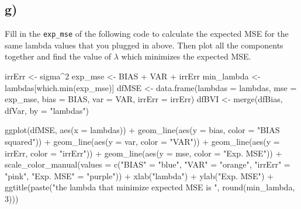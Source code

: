 \documentclass[
]{article}
\newenvironment{Shaded}{\begin{snugshade}}{\end{snugshade}}
\newcommand{\AttributeTok}[1]{\textcolor[rgb]{0.77,0.63,0.00}{#1}}
\newcommand{\DecValTok}[1]{\textcolor[rgb]{0.00,0.00,0.81}{#1}}
\newcommand{\FunctionTok}[1]{\textcolor[rgb]{0.00,0.00,0.00}{#1}}
\newcommand{\NormalTok}[1]{#1}
\newcommand{\OtherTok}[1]{\textcolor[rgb]{0.56,0.35,0.01}{#1}}
\newcommand{\SpecialCharTok}[1]{\textcolor[rgb]{0.00,0.00,0.00}{#1}}
\newcommand{\StringTok}[1]{\textcolor[rgb]{0.31,0.60,0.02}{#1}}
\begin{document}
\hypertarget{g}{%
\subsection{g)}\label{g}}

Fill in the \texttt{exp\_mse} of the following code to calculate the
expected MSE for the same lambda values that you plugged in above. Then
plot all the components together and find the value of \(\lambda\) which
minimizes the expected MSE.

\begin{Shaded}
\begin{Highlighting}[]
\NormalTok{irrErr }\OtherTok{\textless{}{-}}\NormalTok{ sigma}\SpecialCharTok{\^{}}\DecValTok{2}
\NormalTok{exp\_mse }\OtherTok{\textless{}{-}}\NormalTok{ BIAS }\SpecialCharTok{+}\NormalTok{ VAR }\SpecialCharTok{+}\NormalTok{ irrErr}
\NormalTok{min\_lambda }\OtherTok{\textless{}{-}}\NormalTok{ lambdas[}\FunctionTok{which.min}\NormalTok{(exp\_mse)]}
\NormalTok{dfMSE }\OtherTok{\textless{}{-}} \FunctionTok{data.frame}\NormalTok{(}\AttributeTok{lambdas =}\NormalTok{ lambdas, }\AttributeTok{mse =}\NormalTok{ exp\_mse, }\AttributeTok{bias =}\NormalTok{ BIAS, }\AttributeTok{var =}\NormalTok{ VAR, }\AttributeTok{irrErr =}\NormalTok{ irrErr)}
\NormalTok{dfBVI }\OtherTok{\textless{}{-}} \FunctionTok{merge}\NormalTok{(dfBias, dfVar, }\AttributeTok{by =} \StringTok{"lambdas"}\NormalTok{)}

\FunctionTok{ggplot}\NormalTok{(dfMSE, }\FunctionTok{aes}\NormalTok{(}\AttributeTok{x =}\NormalTok{ lambdas)) }\SpecialCharTok{+} 
  \FunctionTok{geom\_line}\NormalTok{(}\FunctionTok{aes}\NormalTok{(}\AttributeTok{y =}\NormalTok{ bias, }\AttributeTok{color =} \StringTok{"BIAS squared"}\NormalTok{)) }\SpecialCharTok{+} 
  \FunctionTok{geom\_line}\NormalTok{(}\FunctionTok{aes}\NormalTok{(}\AttributeTok{y =}\NormalTok{ var, }\AttributeTok{color =} \StringTok{"VAR"}\NormalTok{)) }\SpecialCharTok{+} 
  \FunctionTok{geom\_line}\NormalTok{(}\FunctionTok{aes}\NormalTok{(}\AttributeTok{y =}\NormalTok{ irrErr, }\AttributeTok{color =} \StringTok{"irrErr"}\NormalTok{)) }\SpecialCharTok{+} 
  \FunctionTok{geom\_line}\NormalTok{(}\FunctionTok{aes}\NormalTok{(}\AttributeTok{y =}\NormalTok{ mse, }\AttributeTok{color =} \StringTok{"Exp. MSE"}\NormalTok{)) }\SpecialCharTok{+}
  \FunctionTok{scale\_color\_manual}\NormalTok{(}\AttributeTok{values =} \FunctionTok{c}\NormalTok{(}\StringTok{"BIAS"} \OtherTok{=} \StringTok{"blue"}\NormalTok{, }\StringTok{"VAR"} \OtherTok{=} \StringTok{"orange"}\NormalTok{, }\StringTok{"irrErr"} \OtherTok{=} \StringTok{"pink"}\NormalTok{, }\StringTok{"Exp. MSE"} \OtherTok{=} \StringTok{"purple"}\NormalTok{)) }\SpecialCharTok{+}
  \FunctionTok{xlab}\NormalTok{(}\StringTok{"lambda"}\NormalTok{) }\SpecialCharTok{+}
  \FunctionTok{ylab}\NormalTok{(}\StringTok{"Exp. MSE"}\NormalTok{) }\SpecialCharTok{+}
  \FunctionTok{ggtitle}\NormalTok{(}\FunctionTok{paste}\NormalTok{(}\StringTok{"the lambda that minimize expected MSE is "}\NormalTok{, }\FunctionTok{round}\NormalTok{(min\_lambda, }\DecValTok{3}\NormalTok{)))}
\end{Highlighting}
\end{Shaded}
\end{document}
